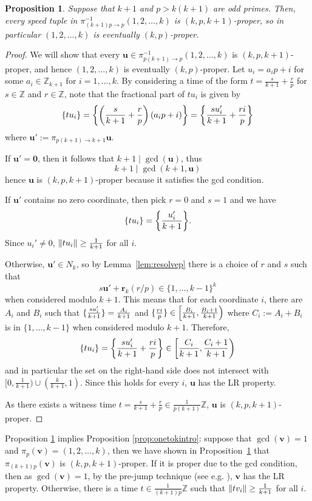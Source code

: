\documentclass[11pt]{amsart}
\DeclarePairedDelimiter\norm{\lVert}{\rVert}
\DeclarePairedDelimiter\fracpart{\{}{\}}
\newcommand{\Z}{\mathbb{Z}}
\newcommand{\rbf}{\mathbf{r}}
\newcommand{\vbf}{\mathbf{v}}
\newcommand{\ubf}{\mathbf{u}}
\newcommand{\onetok}{(1, 2, \dots, k)}
\newtheorem{proposition}[theorem]{Proposition}
\theoremstyle{definition}
\theoremstyle{remark}
\begin{document}
\begin{proposition}
    \label{prop:corlarge}
    Suppose that $k+1$ and $p>k(k+1)$ are odd primes.
    Then, every speed tuple in $\pi_{(k+1)p\rightarrow p}^{-1}\onetok$ is $(k,p,k+1)$-proper, 
    so in particular $\onetok$ is eventually $(k,p)$-proper.
\end{proposition}
\begin{proof}
    We will show that every $\ubf \in \pi_{p(k+1) \to p}^{-1}\onetok$ is $(k,p,k+1)$-proper, 
    and hence $\onetok$ is eventually $(k,p)$-proper.
    Let $u_i = a_ip+i$ for some $a_i\in\Z_{k+1}$ for $i=1,\ldots,k$.
    By considering a time of the form $t=\frac{s}{k+1}+\frac{r}{p}$ for $s\in\Z$ and $r\in\Z$, 
    note that the fractional part of $tu_i$ is given by
    \[ \fracpart{tu_i}=\fracpart*{\left(\frac{s}{k+1}+\frac{r}{p}\right)(a_ip+i)}=\fracpart*{\frac{su'_i}{k+1}+\frac{ri}{p}} \] 
    where $\ubf' := \pi_{p(k+1)\to k+1} \ubf$. 
    
    If $\ubf'=\mathbf0$, then it follows that $k+1\mid\gcd(\ubf)$, thus \[k+1\mid\gcd(k+1,\ubf)\]
    hence $\ubf$ is $(k,p,k+1)$-proper because it satisfies the gcd condition.

    If $\ubf'$ contains no zero coordinate, then pick $r=0$ and $s=1$ and we have 
    \[ \fracpart{tu_i}=\fracpart*{\frac{u'_i}{k+1}}. \]
    Since $u_i' \ne 0$, $\norm{tu_i} \ge \frac{1}{k+1}$ for all $i$.

    Otherwise, $\ubf'\in N_k$, so by Lemma~\ref{lem:resolvep} there is a choice of $r$ and $s$ such that 
    \[ s\ubf' + \rbf_k(r/p) \in \{1,\ldots,k-1\}^k \]
    when considered modulo $k+1$. 
    This means that for each coordinate $i$, there are $A_i$ and $B_i$ such that 
    $\fracpart{\frac{su'_i}{k+1}}=\frac{A_i}{k+1}$ and 
    $\fracpart{\frac{ri}{p}}\in\left[\frac{B_i}{k+1},\frac{B_i+1}{k+1}\right)$ 
    where $C_i:=A_i+B_i$ is in $\{1,\ldots,k-1\}$ when considered modulo $k+1$. 
    Therefore,
    \[\fracpart{tu_i}=\fracpart*{\frac{su'_i}{k+1}+\frac{ri}{p}}\in\left[\frac{C_i}{k+1},\frac{C_i+1}{k+1}\right)\]
    and in particular the set on the right-hand side does not intersect with $[0,\frac{1}{k+1}) \cup (\frac{k}{k+1},1)$.  
    Since this holds for every $i$, $\ubf$ has the LR property.

    As there exists a witness time $t=\frac{s}{k+1}+\frac{r}{p}\in\frac{1}{p(k+1)}\Z$, $\ubf$ is $(k,p,k+1)$-proper.
\end{proof}

Proposition \ref{prop:corlarge} implies Proposition \ref{prop:onetokintro}: 
suppose that $\gcd(\vbf)=1$ and $\pi_p(\vbf)=\onetok$, then we have shown in Proposition~\ref{prop:corlarge}
that $\pi_{(k+1)p}(\vbf)$ is $(k,p,k+1)$-proper. 
If it is proper due to the gcd condition, then as $\gcd(\vbf)=1$, by the pre-jump technique (see e.g. \cite[Lemma 3]{Rosenfeld}), 
$\vbf$ has the LR property. 
Otherwise, there is a time $t\in\frac{1}{(k+1)p}\Z$ such that $\norm{tv_i}\geq\frac{1}{k+1}$ for all $i$.
\end{document}
